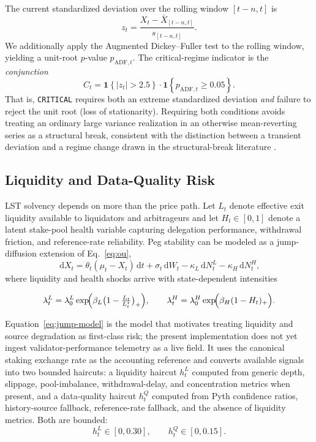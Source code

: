 \documentclass[aps,prx,reprint,nofootinbib,longbibliography]{revtex4-2}
\newcommand{\dd}{\,\mathrm{d}}
\newcommand{\one}{\mathbf{1}}
\begin{document}
The current standardized deviation over the rolling window $[t-n,t]$ is
\begin{equation}
z_t=\frac{X_t-\bar{X}_{[t-n,t]}}{s_{[t-n,t]}}.
\label{eq:zscore}
\end{equation}
We additionally apply the Augmented Dickey--Fuller test
\cite{adf,said_dickey1984} to the rolling window, yielding a unit-root $p$-value
$p_{\mathrm{ADF},t}$. The critical-regime indicator is the \emph{conjunction}
\begin{equation}
C_t=
\one\!\left\{|z_t|>2.5\right\}\cdot
\one\!\left\{p_{\mathrm{ADF},t}\geq 0.05\right\}.
\label{eq:critical}
\end{equation}
That is, \texttt{CRITICAL} requires both an extreme standardized deviation
\emph{and} failure to reject the unit root (loss of stationarity). Requiring both
conditions avoids treating an ordinary large variance realization in an otherwise
mean-reverting series as a structural break, consistent with the distinction
between a transient deviation and a regime change drawn in the structural-break
literature \cite{andrews1993,bai_perron2003}.

\subsection{Liquidity and Data-Quality Risk}

LST solvency depends on more than the price path. Let $L_t$ denote effective exit
liquidity available to liquidators and arbitrageurs and let $H_t\in[0,1]$ denote a
latent stake-pool health variable capturing delegation performance, withdrawal
friction, and reference-rate reliability. Peg stability can be modeled as a
jump-diffusion extension of Eq.~\eqref{eq:ou},
\begin{equation}
\dd X_t
= \theta_t(\mu_t-X_t)\dd t+\sigma_t\dd W_t
- \kappa_L\dd N^L_t
- \kappa_H\dd N^H_t,
\label{eq:jump-model}
\end{equation}
where liquidity and health shocks arrive with state-dependent intensities
\begin{widetext}
\begin{equation}
\lambda^L_t = \lambda^L_0\exp\!\Bigl(\beta_L\bigl(1-\tfrac{L_t}{L^\star_t}\bigr)_+\Bigr),
\qquad
\lambda^H_t = \lambda^H_0\exp\!\Bigl(\beta_H(1-H_t)_+\Bigr).
\end{equation}
\end{widetext}
Equation~\eqref{eq:jump-model} is the model that motivates treating liquidity and
source degradation as first-class risk; the present implementation does not yet
ingest validator-performance telemetry as a live field. It uses the canonical
staking exchange rate as the accounting reference and converts available signals
into two bounded haircuts: a liquidity haircut $h^L_t$ computed from generic depth,
slippage, pool-imbalance, withdrawal-delay, and concentration metrics when present,
and a data-quality haircut $h^Q_t$ computed from Pyth confidence ratios,
history-source fallback, reference-rate fallback, and the absence of liquidity
metrics. Both are bounded:
\begin{equation}
h^L_t\in[0,0.30],\qquad h^Q_t\in[0,0.15].
\label{eq:haircut-bounds}
\end{equation}
\end{document}
